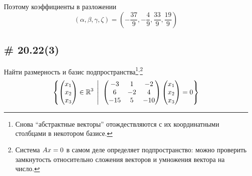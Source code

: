 \documentclass[a4paper,12pt]{article}
\newcommand{\BigMiddleThree}{\;\left|\vphantom{\begin{pmatrix} 0\\0\\0 \end{pmatrix}}\right.\;}
\begin{document}
  Поэтому коэффициенты в разложении
  \[
    (\alpha, \beta,  \gamma, \zeta) = \left(-\frac{37}{9}, -\frac{4}{9}, \frac{33}{9}, \frac{19}{9}\right)
  \]
  
  
  \subsection{\# 20.22(3)}
  
  
  Найти размерность и базис подпространства\footnote{Снова ``абстрактные векторы'' отождествляются с их координатными столбцами в некотором базисе.}\textsuperscript{,}\footnote{Система $Ax \hm= 0$ в самом деле определяет подпространство: можно проверить замкнутость относительно сложения векторов и умножения вектора на число.}
  \[
    \left\{
      \begin{pmatrix}
        x_1 \\ x_2 \\ x_3
      \end{pmatrix} \in \RR^3
      \BigMiddleThree
      \begin{pmatrix}
        -3 & 1 & -2\\
        6 & -2 & 4\\
        -15 & 5 & -10
      \end{pmatrix}
      \begin{pmatrix}
        x_1 \\ x_2 \\ x_3
      \end{pmatrix}
      = 0
    \right\}
  \]
  
\end{document}
